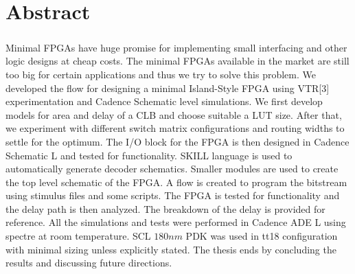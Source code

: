 %
%
%

\chapter*{Abstract}
\begin{OnehalfSpacing}
\paragraph{}
\end{OnehalfSpacing}
Minimal FPGAs have huge promise for implementing small interfacing and other logic designs at cheap costs. The minimal FPGAs available in the market are still too big for certain applications and thus we try to solve this problem. We developed the flow for designing a minimal Island-Style FPGA using VTR[3] experimentation and Cadence Schematic level simulations. We first develop models for area and delay of a CLB and choose suitable a LUT size. After that, we experiment with different switch matrix configurations and routing widths to settle for the optimum. The I/O block for the FPGA is then designed in Cadence Schematic L and tested for functionality. SKILL language is used to automatically generate decoder schematics. Smaller modules are used to create the top level schematic of the FPGA. A flow is created to program the bitstream using stimulus files and some scripts. The FPGA is tested for functionality and the delay path is then analyzed. The breakdown of the delay is provided for reference. All the simulations and tests were performed in Cadence ADE L using spectre at room temperature. SCL $180nm$ PDK was used in tt18 configuration with minimal sizing unless explicitly stated. The thesis ends by concluding the results and discussing future directions.

\clearpage 
